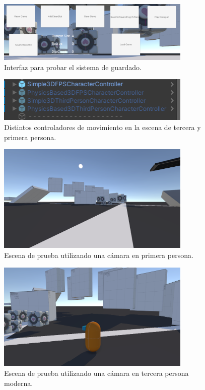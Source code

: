 \begin{figure}[H]
   \centering
     \includegraphics[width=350px,clip=true]{FPSTestSceneSaves.png}
   \caption{Interfaz para probar el sistema de guardado.}
   \label{fig:savingUI}
\end{figure}

\begin{figure}[H]
   \centering
     \includegraphics[width=350px,clip=true]{3dFPSTestSceneControllers.png}
   \caption{Distintos controladores de movimiento en la escena de tercera y primera persona.}
   \label{fig:fpscontrollers}
\end{figure}

\begin{figure}[H]
   \centering
     \includegraphics[width=350px,clip=true]{3DFPSTestScene.png}
   \caption{Escena de prueba utilizando una cámara en primera persona.}
   \label{fig:fpsGame}
\end{figure}

\begin{figure}[H]
   \centering
     \includegraphics[width=350px,clip=true]{TPSTestScene.png}
   \caption{Escena de prueba utilizando una cámara en tercera persona moderna.}
   \label{fig:tpsGame}
\end{figure}


